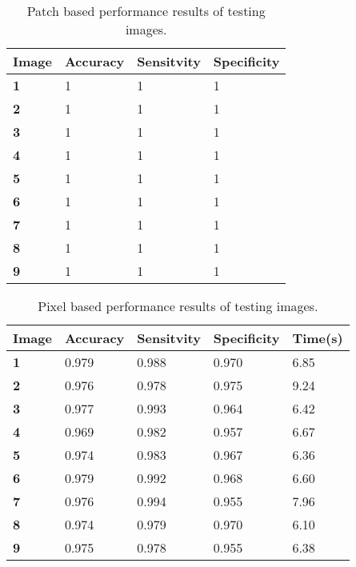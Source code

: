 \begin{table}[H]
\centering
\caption{Patch based performance results of testing images.}

\begin{tabular}{|l|l|l|l|}
\hline
\textbf{Image}	& \textbf{Accuracy} & \textbf{Sensitvity} & \textbf{Specificity}\\
\hline
\textbf{1}		& 1		& 1		& 1\\ 
\hline
\textbf{2} 		& 1		& 1		& 1	\\
\hline
\textbf{3}		& 1		& 1		& 1	\\
\hline
\textbf{4}		& 1		& 1		& 1	\\
\hline
\textbf{5}		& 1		& 1		& 1	\\
\hline
\textbf{6} 		& 1		& 1		& 1	\\
\hline
\textbf{7}		& 1		& 1		& 1	\\
\hline
\textbf{8}		& 1		& 1		& 1\\
\hline
\textbf{9} 		& 1		& 1		& 1\\
\hline				    	 			   			    	 
\end{tabular}
\label{table:patchacc}
\end{table}


\begin{table}[H]
\centering
\caption{Pixel based performance results of testing images.}

\begin{tabular}{|l|l|l|l|l|}
\hline
\textbf{Image}	& \textbf{Accuracy} & \textbf{Sensitvity} & \textbf{Specificity} & \textbf{Time(s)}\\
\hline
\textbf{1}		& 0.979		& 0.988		& 0.970		& 6.85 \\ 
\hline
\textbf{2} 		& 0.976		& 0.978		& 0.975		& 9.24\\
\hline
\textbf{3}		& 0.977		& 0.993 		& 0.964		& 6.42\\
\hline
\textbf{4}		& 0.969		& 0.982		& 0.957		& 6.67\\
\hline
\textbf{5}		& 0.974		& 0.983		& 0.967		& 6.36\\
\hline
\textbf{6} 		& 0.979		& 0.992		& 0.968		& 6.60\\
\hline
\textbf{7}		& 0.976		& 0.994		& 0.955		& 7.96\\
\hline
\textbf{8}		& 0.974		& 0.979		& 0.970		& 6.10\\
\hline
\textbf{9} 		& 0.975		& 0.978		& 0.955		& 6.38\\
\hline				    	 			   			    	 
\end{tabular}
\label{table:pixelacc}
\end{table}

